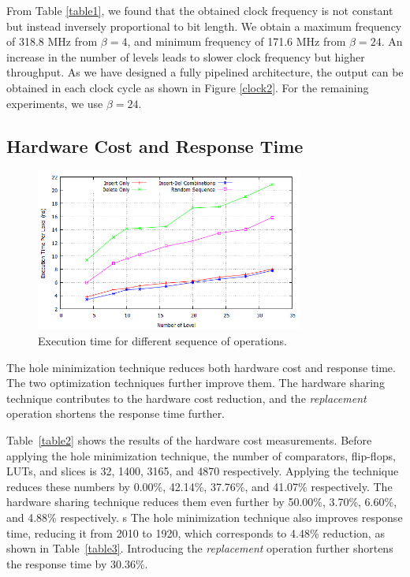 From Table \ref{table1}, we found that the obtained clock frequency is not constant but instead inversely proportional to bit length.
We obtain a maximum frequency of 318.8 MHz from $\beta = 4$, and minimum frequency of 171.6 MHz from $\beta = 24$.
An increase in the number of levels leads to slower clock frequency but higher throughput.
As we have designed a fully pipelined architecture, the output can be obtained in each clock cycle as shown in Figure \ref{clock2}.
For the remaining experiments, we use $\beta = 24$.

\subsection{Hardware Cost and Response Time}

\begin{figure}[!ht]
  \centering
  \includegraphics[width=8.8cm]{fig/random.png}
      \caption{Execution time for different sequence of operations.}
    \label{random}
\end{figure}

The hole minimization technique reduces both hardware cost and response time.
The two optimization techniques further improve them.
The hardware sharing technique contributes to the hardware cost reduction, and the {\it replacement} operation shortens the response time further.

Table~\ref{table2} shows the results of the hardware cost measurements.
Before applying the hole minimization technique, the number of comparators, flip-flops, LUTs, and slices is 32, 1400, 3165, and 4870 respectively.
Applying the technique reduces these numbers by 0.00\%, 42.14\%, 37.76\%, and 41.07\% respectively.
The hardware sharing technique reduces them even further by 50.00\%, 3.70\%, 6.60\%, and 4.88\% respectively.
s
The hole minimization technique also improves response time, reducing it from 2010 to 1920, which corresponds to 4.48\% reduction, as shown in Table~\ref{table3}.
Introducing the {\it replacement} operation further shortens the response time by 30.36\%.

